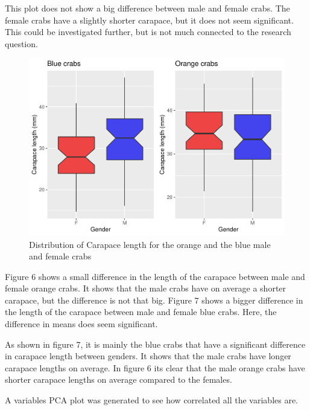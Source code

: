 \documentclass[
]{article}
\begin{document}
This plot does not show a big difference between male and female crabs.
The female crabs have a slightly shorter carapace, but it does not seem
significant. This could be investigated further, but is not much
connected to the research question.

\begin{figure}[H]

{\centering \includegraphics{CrabProject_files/figure-latex/figure6-1} 

}

\caption{Distribution of Carapace length for the orange and the blue male and female crabs}\label{fig:figure6}
\end{figure}

Figure 6 shows a small difference in the length of the carapace between
male and female orange crabs. It shows that the male crabs have on
average a shorter carapace, but the difference is not that big. Figure 7
shows a bigger difference in the length of the carapace between male and
female blue crabs. Here, the difference in means does seem significant.

As shown in figure 7, it is mainly the blue crabs that have a
significant difference in carapace length between genders. It shows that
the male crabs have longer carapace lengths on average. In figure 6 its
clear that the male orange crabs have shorter carapace lengths on
average compared to the females.

A variables PCA plot was generated to see how correlated all the
variables are.
\end{document}
